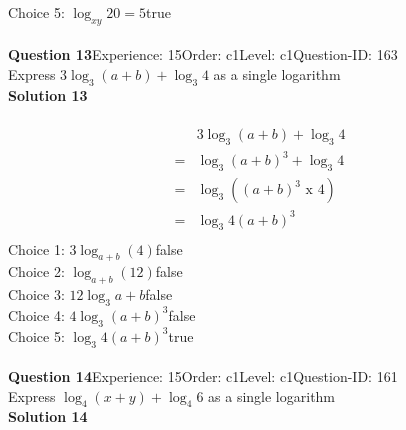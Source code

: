 \documentclass{article}
\begin{document}
Choice 5: \hspace{20pt}$\log_{xy}20=5$\hspace{20pt}true\\
\\[4pt]
\noindent\textbf{Question 13}\hspace{20pt}Experience: 15\hspace{20pt}Order: c1\hspace{20pt}Level: c1\hspace{20pt}Question-ID: 163\\[2pt]
Express $3\log_{3}(a+b)+\log_{3}4$ as a single logarithm\\[4pt]
\noindent\textbf{Solution 13}\\[2pt]
\\[-35pt]\begin{align*}
&3\log_{3}(a+b)+\log_{3}4\\[2pt]
=&\log_{3}(a+b)^3+\log_{3}4\\[2pt]
=&\log_{3}((a+b)^3 \,\, \text{x} \,\, 4)\\[2pt]
=&\log_{3}4(a+b)^3\\[-80pt]
\end{align*}
Choice 1: \hspace{20pt}$3\log_{a+b}(4)$\hspace{20pt}false\\
Choice 2: \hspace{20pt}$\log_{a+b}(12)$\hspace{20pt}false\\
Choice 3: \hspace{20pt}$12\log_{3}a+b$\hspace{20pt}false\\
Choice 4: \hspace{20pt}$4\log_{3}(a+b)^3$\hspace{20pt}false\\
Choice 5: \hspace{20pt}$\log_{3}4(a+b)^3$\hspace{20pt}true\\
\\[4pt]
\noindent\textbf{Question 14}\hspace{20pt}Experience: 15\hspace{20pt}Order: c1\hspace{20pt}Level: c1\hspace{20pt}Question-ID: 161\\[2pt]
Express $\log_{4}(x+y)+\log_{4}6$ as a single logarithm\\[4pt]
\noindent\textbf{Solution 14}\\[2pt]
\end{document}
